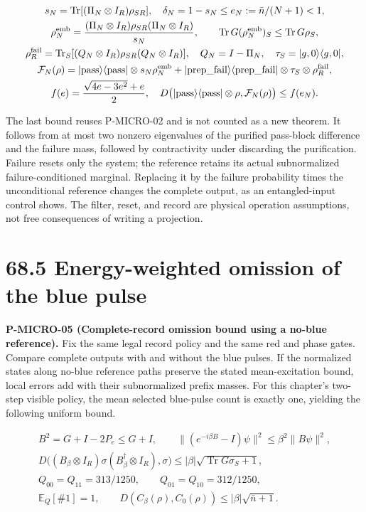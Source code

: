 \documentclass[
  11pt,
  oneside]{book}
\begin{document}
\[
\begin{gathered}
s_N=\operatorname{Tr}[(\Pi_N\otimes I_R)\rho_{SR}],\quad
\delta_N=1-s_N\le e_N:=\bar n/(N+1)<1,\\
\rho_N^{\rm emb}=\frac{(\Pi_N\otimes I_R)\rho_{SR}(\Pi_N\otimes I_R)}{s_N},
\qquad \operatorname{Tr}G(\rho_N^{\rm emb})_S\le\operatorname{Tr}G\rho_S,\\
\rho_R^{\rm fail}=\operatorname{Tr}_S[(Q_N\otimes I_R)\rho_{SR}(Q_N\otimes I_R)],
\quad Q_N=I-\Pi_N,\quad \tau_S=|g,0\rangle\langle g,0|,\\
\mathcal F_N(\rho)=
|{\rm pass}\rangle\langle{\rm pass}|\otimes s_N\rho_N^{\rm emb}
+|{\rm prep\_\allowbreak fail}\rangle\langle{\rm prep\_\allowbreak fail}|\otimes\tau_S\otimes\rho_R^{\rm fail},\\
f(e)=\frac{\sqrt{4e-3e^2}+e}{2},\quad
D\bigl(|{\rm pass}\rangle\langle{\rm pass}|\otimes\rho,\mathcal F_N(\rho)\bigr)
\le f(e_N).
\end{gathered}
\]

The last bound reuses P-MICRO-02 and is not counted as a new theorem. It
follows from at most two nonzero eigenvalues of the purified pass-block
difference and the failure mass, followed by contractivity under
discarding the purification. Failure resets only the system; the
reference retains its actual subnormalized failure-conditioned marginal.
Replacing it by the failure probability times the unconditional
reference changes the complete output, as an entangled-input control
shows. The filter, reset, and record are physical operation assumptions,
not free consequences of writing a projection.

\section{68.5 Energy-weighted omission of the blue pulse}

\label{p-micro-05}{}

\textbf{P-MICRO-05 (Complete-record omission bound using a no-blue
reference).} Fix the same legal record policy and the same red and phase
gates. Compare complete outputs with and without the blue pulses. If the
normalized states along no-blue reference paths preserve the stated
mean-excitation bound, local errors add with their subnormalized prefix
masses. For this chapter's two-step visible policy, the mean selected
blue-pulse count is exactly one, yielding the following uniform bound.

\[
\begin{gathered}
B^2=G+I-2P_e\le G+I,\qquad
\|(e^{-i\beta B}-I)\psi\|^2\le\beta^2\|B\psi\|^2,\\
D\bigl((B_\beta\otimes I_R)\sigma(B_\beta^\dagger\otimes I_R),\sigma\bigr)
\le|\beta|\sqrt{\operatorname{Tr}G\sigma_S+1},\\
Q_{00}=Q_{11}=313/1250,\qquad Q_{01}=Q_{10}=312/1250,\\
\mathbb E_Q[\#1]=1,\qquad
D(C_\beta(\rho),C_0(\rho))\le|\beta|\sqrt{\bar n+1}.
\end{gathered}
\]
\end{document}
